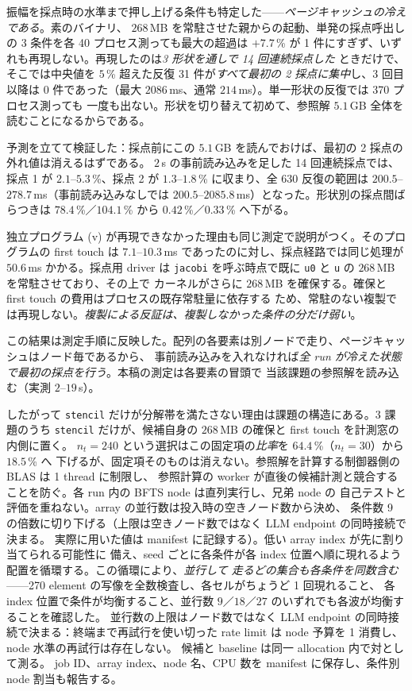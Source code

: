 \documentclass[conference,letterpaper]{IEEEtran}
\begin{document}
振幅を採点時の水準まで押し上げる条件も特定した——\emph{ページキャッシュの冷えである}。素のバイナリ、
$268$\,MB を常駐させた親からの起動、単発の採点呼出しの 3 条件を各 40 プロセス測っても最大の超過は
$+7.7$\,\% が 1 件にすぎず、いずれも再現しない。再現したのは\emph{3 形状を通しで 14 回連続採点した}
ときだけで、そこでは中央値を $5$\,\% 超えた反復 31 件が\emph{すべて最初の 2 採点に集中}し、3 回目
以降は 0 件であった（最大 $2086$\,ms、通常 $214$\,ms）。単一形状の反復では 370 プロセス測っても
一度も出ない。形状を切り替えて初めて、参照解 $5.1$\,GB 全体を読むことになるからである。

予測を立てて検証した：採点前にこの $5.1$\,GB を読んでおけば、最初の 2 採点の外れ値は消えるはずである。
$2$\,s の事前読み込みを足した 14 回連続採点では、採点 1 が $2.1$--$5.3$\,\%、採点 2 が
$1.3$--$1.8$\,\% に収まり、全 630 反復の範囲は $200.5$--$278.7$\,ms（事前読み込みなしでは
$200.5$--$2085.8$\,ms）となった。形状別の採点間ばらつきは $78.4$\,\%／$104.1$\,\% から
$0.42$\,\%／$0.33$\,\% へ下がる。

独立プログラム (v) が再現できなかった理由も同じ測定で説明がつく。そのプログラムの first touch は
$7.1$--$10.3$\,ms であったのに対し、採点経路では同じ処理が $50.6$\,ms かかる。採点用 driver は
\texttt{jacobi} を呼ぶ時点で既に \texttt{u0} と \texttt{u} の $268$\,MB を常駐させており、その上で
カーネルがさらに $268$\,MB を確保する。確保と first touch の費用はプロセスの既存常駐量に依存する
ため、常駐のない複製では再現しない。\emph{複製による反証は、複製しなかった条件の分だけ弱い}。

この結果は測定手順に反映した。配列の各要素は別ノードで走り、ページキャッシュはノード毎であるから、
事前読み込みを入れなければ\emph{全 run が冷えた状態で最初の採点を行う}。本稿の測定は各要素の冒頭で
当該課題の参照解を読み込む（実測 $2$--$19$\,s）。

したがって \texttt{stencil} だけが分解帯を満たさない理由は課題の構造にある。3 課題のうち
\texttt{stencil} だけが、候補自身の $268$\,MB の確保と first touch を計測窓の内側に置く。
$n_t=240$ という選択はこの固定項の\emph{比率}を $64.4$\,\%（$n_t=30$）から $18.5$\,\% へ
下げるが、固定項そのものは消えない。参照解を計算する制御器側の BLAS は 1 thread に制限し、
参照計算の worker が直後の候補計測と競合することを防ぐ。各 run 内の BFTS node は直列実行し、兄弟 node の
自己テストと評価を重ねない。array の並行数は投入時の空きノード数から決め、
条件数 9 の倍数に切り下げる（上限は空きノード数ではなく LLM endpoint の同時接続で決まる。
実際に用いた値は manifest に記録する）。低い array index が先に割り当てられる可能性に
備え、seed ごとに各条件が各 index 位置へ順に現れるよう配置を循環する。この循環により、\emph{並行して
走るどの集合も各条件を同数含む}——270 element の写像を全数検査し、各セルがちょうど 1 回現れること、
各 index 位置で条件が均衡すること、並行数 $9$／$18$／$27$ のいずれでも各波が均衡することを確認した。
並行数の上限はノード数ではなく LLM endpoint の同時接続で決まる：終端まで再試行を使い切った
rate limit は node 予算を 1 消費し、node 水準の再試行は存在しない。
候補と baseline は同一 allocation 内で対として測る。
job ID、array index、node 名、CPU 数を manifest に保存し、条件別 node 割当も報告する。
\end{document}
